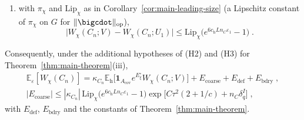 \begin{proposition}
\begin{enumerate}[label=(\roman*)]
\begin{equation}
    \end{equation}
    where $V(c_j)P_{c_j}(U_1)^{-1}$ depends on $U_1$ only through the bonds with both endpoints in the two blocks of $c_j$;
    \item with $\pi_{\chi}$ and $\mathrm{Lip}_{\chi}$ as in Corollary~\ref{cor:main-leading-size} (a Lipschitz constant of $\pi_{\chi}$ on $G$ for $\|\bigcdot\|_{\mathrm{op}}$),
    \begin{equation}\label{eq:coarse-loop-difference}
        \bigl|W_{\chi}(C_n;V)-W_{\chi}(C_n;U_1)\bigr|\leqslant \mathrm{Lip}_{\chi}\bigl(e^{6c_{\mathrm h}Ln_C\varepsilon_1}-1\bigr)\;.
    \end{equation}
\end{enumerate}
Consequently, under the additional hypotheses of (H2) and (H3) for Theorem~\ref{thm:main-theorem}(iii),
\begin{equation*}
    \begin{gathered}
        \mathbb E_{\varepsilon}[W_{\chi}(C_n)]=\kappa_{C_n}\mathbb E_{\mathrm h}\bigl[\mathbf 1_{A_{\mathrm{cov}}}e^{E^{\circ}_{\xi}}W_{\chi}(C_n;V)\bigr]+E_{\mathrm{coarse}}+E_{\mathrm{def}}+E_{\mathrm{bdry}}\;,\\
        | E_{\mathrm{coarse}}|\leqslant |\kappa_{C_n}|\,\mathrm{Lip}_{\chi}\bigl(e^{6c_{\mathrm h}Ln_C\varepsilon_1}-1\bigr)\exp\bigl[C\tau^2(2+1/c)+n_C\delta^I_q\bigr]\;,
    \end{gathered}
\end{equation*}
with $E_{\mathrm{def}}$, $E_{\mathrm{bdry}}$ and the constants of Theorem~\ref{thm:main-theorem}.
\end{proposition}

